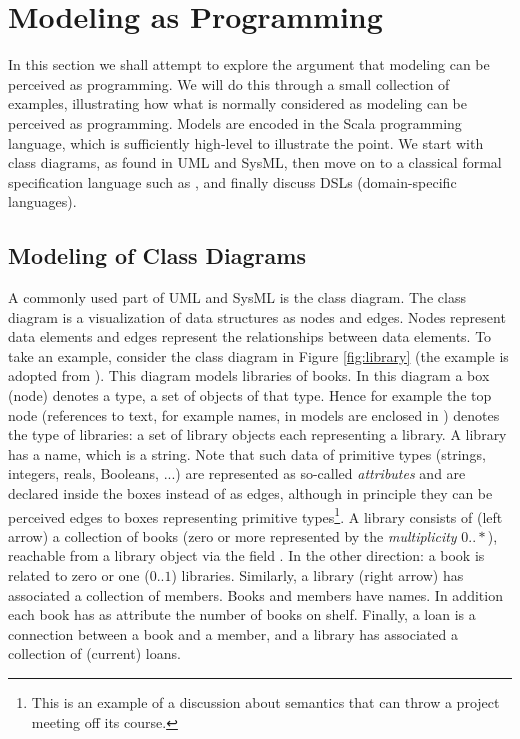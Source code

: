 
\section{Modeling as Programming}
\label{sec:modeling-as-programming}

In this section we shall attempt to explore the argument that
modeling can be perceived as programming. We will do this through
a small collection of examples, illustrating how what is normally
considered as modeling can be perceived as programming. 
Models are encoded in the Scala programming language, which is
sufficiently high-level to illustrate the point.
We start with class diagrams, as found in UML and SysML, then move on to a classical formal specification language such as \vdmpp{}, and finally discuss DSLs (domain-specific languages).

\subsection{Modeling of Class Diagrams}
\label{sec:complex-classes-in-scala}

A commonly used part of UML and SysML is the class diagram. The class diagram is a visualization of data structures as nodes and edges. Nodes represent data elements and edges represent the relationships between data elements. To take an
example, consider the class diagram in Figure \ref{fig:library}
(the example is adopted from \cite{oclinecoreTutorial}). This diagram models libraries of books. In this diagram a box (node) denotes a type, a set of objects of that type. Hence for example the top node  
(references to text, for example names, in models are enclosed in ) denotes the type of libraries: a set
of library objects each representing a library.
A library has a name, which is a string. Note that
such data of primitive types (strings, integers, reals, Booleans, ...) are represented as so-called {\em attributes} and are declared inside the boxes instead of as edges, although in principle they can be perceived edges to boxes representing primitive types\footnote{This is an example of a discussion
about semantics that can throw a project meeting off its course.}. 
A library consists of (left arrow) 
a collection of books (zero or more represented by 
the {\em multiplicity} $0 .. *$),
reachable from a library object via the field . In the other direction: a book is related to zero or one ($0 .. 1$) libraries.
Similarly, a library (right arrow) has associated a collection of
members. Books and members have names. In addition each book has as
attribute the number of books on shelf. Finally, a loan is a 
connection between a book and a member, and a library has 
associated a collection of (current) loans.

